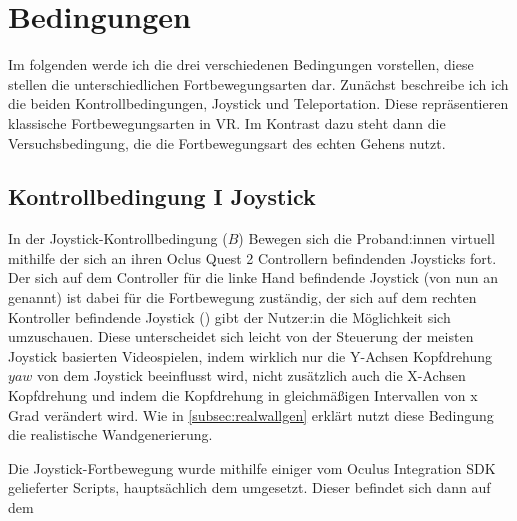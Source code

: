     \section{Bedingungen}\label{sec:conditions}
        Im folgenden werde ich die drei verschiedenen Bedingungen vorstellen, diese stellen die unterschiedlichen Fortbewegungsarten dar. Zunächst beschreibe ich ich die beiden Kontrollbedingungen, Joystick und Teleportation. Diese repräsentieren klassische Fortbewegungsarten in VR. Im Kontrast dazu steht dann die Versuchsbedingung, die die Fortbewegungsart des echten Gehens nutzt.

        \subsection{Kontrollbedingung I Joystick}\label{subsec:joystick}
            In der Joystick-Kontrollbedingung ($B$) Bewegen sich die Proband:innen virtuell mithilfe der sich an ihren Oclus Quest 2 Controllern befindenden Joysticks fort. %
            Der sich auf dem Controller für die linke Hand befindende Joystick (von nun an  genannt) ist dabei für die Fortbewegung zuständig, der sich auf dem rechten Kontroller befindende Joystick () gibt der Nutzer:in die Möglichkeit sich umzuschauen. Diese unterscheidet sich leicht von der Steuerung der meisten Joystick basierten Videospielen, indem wirklich nur die Y-Achsen Kopfdrehung $yaw$ von dem Joystick beeinflusst wird, nicht zusätzlich auch die X-Achsen Kopfdrehung und indem die Kopfdrehung in gleichmäßigen Intervallen von x Grad %
            verändert wird. %
            Wie in \autoref{subsec:realwallgen} erklärt nutzt diese Bedingung die realistische Wandgenerierung.

            Die Joystick-Fortbewegung wurde mithilfe einiger vom Oculus Integration SDK gelieferter Scripts, hauptsächlich dem  umgesetzt. Dieser befindet sich dann auf dem



